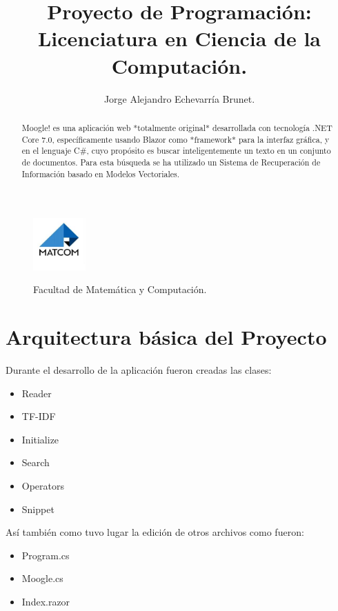 \documentclass{article}
\begin{document}
\title{Proyecto de Programación:\\ Licenciatura en Ciencia de la Computación.}
\author{Jorge Alejandro Echevarría Brunet.}
\date{}
\maketitle

\begin{figure}[h]
	\center
	\includegraphics[width=2cm]{matcom.jpg}
	\label{fig:logo}

	\begin{center}
		\Large Facultad de Matemática y Computación.
	\end{center}
\end{figure}

\begin{abstract}
	Moogle! es una aplicación web *totalmente original* desarrollada con tecnología
	.NET Core 7.0, específicamente usando Blazor como *framework* para la interfaz
	gráfica, y en el lenguaje C\#, cuyo propósito es buscar inteligentemente un texto
	en un conjunto de documentos. Para esta búsqueda se ha utilizado un Sistema de
	Recuperación de Información basado en Modelos Vectoriales.
\end{abstract}

\section{Arquitectura básica del Proyecto}
Durante el desarrollo de la aplicación fueron creadas las clases:
\begin{itemize}
	\item Reader
	\item TF-IDF
	\item Initialize
	\item Search
	\item Operators
	\item Snippet
\end{itemize}

\newpage
Así también como tuvo lugar la edición de otros archivos como fueron:
\begin{itemize}
	\item Program.cs
	\item Moogle.cs
	\item Index.razor
\end{itemize}
\end{document}
